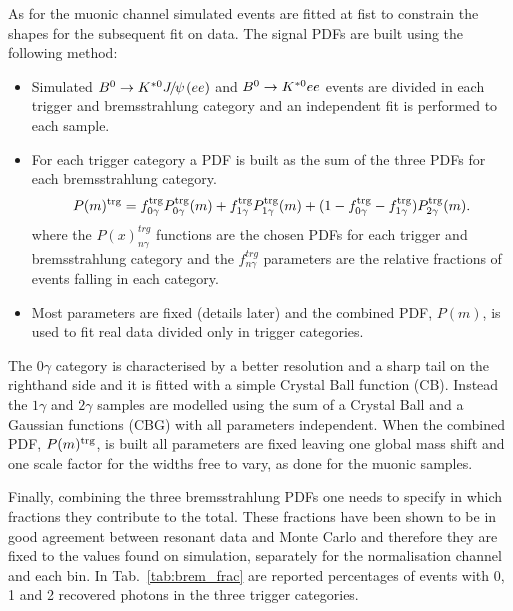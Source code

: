 As for the muonic channel simulated events are fitted at fist to constrain
the shapes for the subsequent fit on data. The signal PDFs are built using the following method:
%
\begin{itemize}
\item Simulated $\Bz\to\Kstarz\jpsi(ee)$ and ${{B}^0}\rightarrow{\ensuremath{{K}^{*0}}} ee$ events are divided
in each trigger and bremsstrahlung category and an independent fit is performed to each sample.
\item For each trigger category a PDF is built as the sum of the three PDFs for each bremsstrahlung category.
\begin{equation}
P(m)^{\rm trg} = f^{\rm trg}_{0\gamma} P^{\rm trg}_{0\gamma}(m) + f^{\rm trg}_{1\gamma} P^{\rm trg}_{1\gamma}(m) + (1 - f^{\rm trg}_{0\gamma} - f^{\rm trg}_{1\gamma}) P^{\rm trg}_{2\gamma}(m).
\end{equation}
where the $P(x)^{trg}_{n\gamma}$ functions are the chosen PDFs for each trigger and bremsstrahlung category
and the $f^{trg}_{n\gamma}$ parameters are the relative fractions of events falling in each category.
\item Most parameters are fixed (details later) and the combined PDF, $P(m)$,
is used to fit real data divided only in trigger categories.
\end{itemize}

The $0\gamma$ category is characterised by a better resolution and a sharp tail on the righthand
side and it is fitted with a simple Crystal Ball function (CB). Instead the $1\gamma$ and $2\gamma$
samples are modelled using the sum of a Crystal Ball and a Gaussian functions (CBG) with all parameters independent.
When the combined PDF, $P(m)^{\rm trg}$, is built all parameters are fixed leaving one global mass shift 
and one scale factor for the widths free to vary, as done for the muonic samples.

Finally, combining the three bremsstrahlung PDFs one needs to specify in which fractions they
contribute to the total. These fractions have been shown to be in good agreement between 
resonant data and Monte Carlo
and therefore they are fixed to the values found on simulation, separately for the normalisation
channel and each \qsq bin. In Tab.~\ref{tab:brem_frac} are reported percentages of events
with 0, 1 and 2 recovered photons in the three trigger categories.

